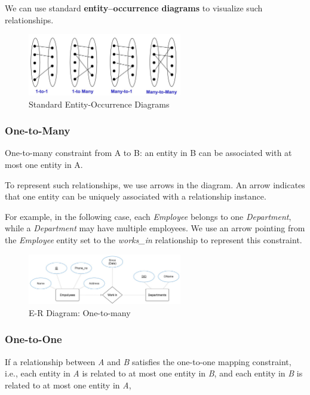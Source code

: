 We can use standard \textbf{entity–occurrence diagrams} to visualize such relationships.

\begin{figure}[H]
  \centering
  \includegraphics[width=0.6\textwidth]{Figure/EOD1.pdf}
  \caption{Standard Entity-Occurrence Diagrams}
\end{figure}

\subsubsection{One-to-Many}
One-to-many constraint from A to B: an entity in B can be associated with at most one entity in A.

To represent such relationships, we use arrows in the diagram. An arrow indicates that one entity can be uniquely associated with a relationship instance.  

For example, in the following case, each \emph{Employee} belongs to one \emph{Department}, while a \emph{Department} may have multiple employees. We use an arrow pointing from the \emph{Employee} entity set to the \emph{works\_in} relationship to represent this constraint.

\begin{figure}[H]
  \centering
  \includegraphics[width=0.6\textwidth]{Figure/ER4.pdf}
  \caption{E-R Diagram: One-to-many}
\end{figure}

\subsubsection{One-to-One}
If a relationship between \emph{A} and \emph{B} satisfies the one-to-one mapping constraint, i.e., each entity in \emph{A} is related to at most one entity in \emph{B}, and each entity in \emph{B} is related to at most one entity in \emph{A},  


